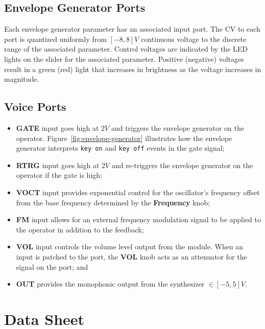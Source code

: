 \documentclass[12pt,letter]{article}
\begin{document}
\subsection{Envelope Generator Ports}

Each envelope generator parameter has an associated input port. The CV to each port is quantized uniformly from $[-8, 8]V$ continuous voltage to the discrete range of the associated parameter. Control voltages are indicated by the LED lights on the slider for the associated parameter. Positive (negative) voltages result in a green (red) light that increases in brightness as the voltage increases in magnitude.

\subsection{Voice Ports}

\begin{itemize}
 \item \textbf{GATE} input goes high at $2V$ and triggers the envelope generator on the operator. Figure~\ref{fig:envelope-generator} illustrates how the envelope generator interprets \texttt{key on} and \texttt{key off} events in the gate signal;
 \item \textbf{RTRG} input goes high at $2V$ and re-triggers the envelope generator on the operator if the gate is high;
 \item \textbf{VOCT} input provides exponential control for the oscillator's frequency offset from the base frequency determined by the \textbf{Frequency} knob;
 \item \textbf{FM} input allows for an external frequency modulation signal to be applied to the operator in addition to the feedback;
 \item \textbf{VOL} input controls the volume level output from the module. When an input is patched to the port, the \textbf{VOL} knob acts as an attenuator for the signal on the port; and
 \item \textbf{OUT} provides the monophonic output from the synthesizer $\in[-5,5]V$.
\end{itemize}


\clearpage
\section{Data Sheet}
\end{document}
